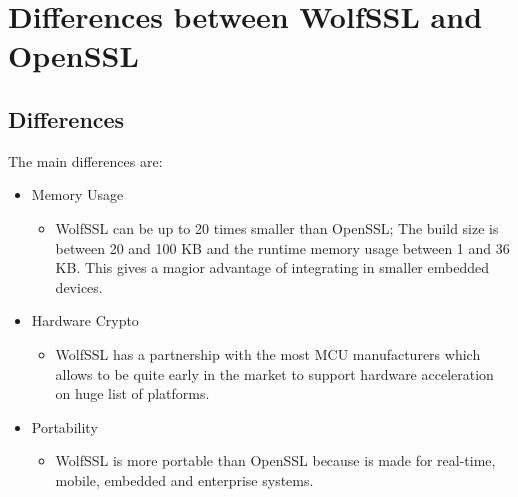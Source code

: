 \documentclass[a4paper,12pt]{report}
\begin{document}
\chapter{Differences between WolfSSL and OpenSSL}
\section{Differences}

The main differences are:
\begin{itemize}
\item Memory Usage
\begin{itemize}
\item WolfSSL can be up to 20 times smaller than OpenSSL; The build size is between 20 and 100 KB and the runtime memory usage between 1 and 36 KB. This gives a magior advantage of integrating in smaller embedded devices. 
\end{itemize}
\item Hardware Crypto
\begin{itemize}
\item WolfSSL has a partnership with the most MCU manufacturers which allows to be quite early in the market to support hardware acceleration on huge list of platforms.
\end{itemize}
\item Portability
\begin{itemize}
\item WolfSSL is more portable than OpenSSL because is made for real-time, mobile, embedded and enterprise systems.
\end{itemize}
\end{itemize}
\end{document}
